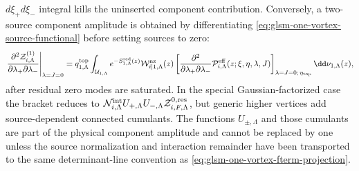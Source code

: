 \begin{controlledapproximation}
\(d\xi_+d\xi_-\) integral kills the uninserted component contribution.
Conversely, a two-source component amplitude is obtained by differentiating
\eqref{eq:glsm-one-vortex-source-functional} before setting sources to zero:
\begin{equation}
  \left.
  \frac{\partial^2\mathcal Z^{(1)}_{i,\Lambda}}
       {\partial\lambda_+\partial\lambda_-}
  \right|_{\lambda=J=0}
  =
  q^{\rm top}_{1,\Lambda}
  \int_{\mathcal U_{1,\Lambda}}
  e^{-S^{\rm red}_{1,\Lambda}(z)}
  \mathcal W^{\rm nz}_{i|1,\Lambda}(z)
  \left[
    \frac{\partial^2}
      {\partial\lambda_+\partial\lambda_-}
    \mathcal P^{\rm eff}_{i,\Lambda}(z;\xi,\eta,\lambda,J)
  \right]_{\lambda=J=0;\,\eta_{\rm top}}
  \dd\nu_{1,\Lambda}(z),
  \label{eq:glsm-one-vortex-source-derivative}
\end{equation}
after residual zero modes are saturated.  In the special Gaussian-factorized
case the bracket reduces to
\(\mathcal N^{\rm int}_{i,\Lambda}U_{+,\Lambda}U_{-,\Lambda}
\mathcal Z^{0,{\rm res}}_{i,F,\Lambda}\), but generic higher vertices add
source-dependent connected cumulants.  The functions \(U_{\pm,\Lambda}\) and
those cumulants are part of the physical component amplitude and cannot be
replaced by one unless the source normalization and interaction remainder have
been transported to the same determinant-line convention as
\eqref{eq:glsm-one-vortex-fterm-projection}.


\end{controlledapproximation}

